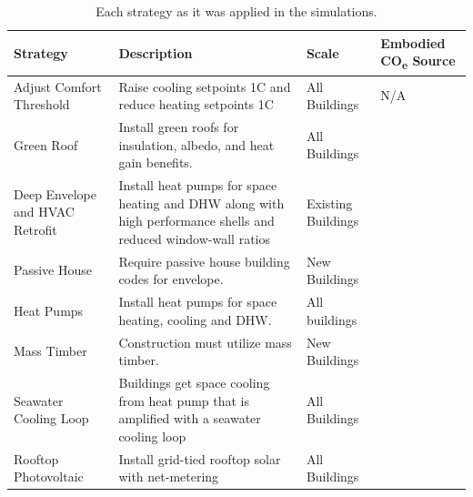 \documentclass[twocolumn, a4paper,10pt]{article}
\begin{document}
\begin{table}[ht]
    \vspace{-5pt}   %
    \caption{Each strategy as it was applied in the simulations.}
    \footnotesize
    \label{tab:strategies}
    \centering
    \begin{tabularx}{\linewidth}{|>{\hsize=0.2\hsize}X|
                              >{\hsize=0.4\hsize}X|
                              >{\hsize=0.15\hsize}X|
                              >{\hsize=0.25\hsize}X|}
        \hline
        \bf{Strategy} & \bf{Description} & \bf{Scale} & \bf{Embodied CO\textsubscript{e} Source} \\
        \hline
        Adjust Comfort Threshold & Raise cooling setpoints 1C and reduce heating setpoints 1C & All Buildings & N/A \\
        \hline
        Green Roof & Install green roofs for insulation, albedo, and heat gain benefits. & All Buildings & \citep{jones_ice_2019}\\
        \hline
        Deep Envelope and HVAC Retrofit & Install heat pumps for space heating and DHW along with high performance shells and reduced window-wall ratios & Existing Buildings & \citep{jones_ice_2019, rodriguez_embodied_2019} \\
        \hline
        Passive House & Require passive house building codes for envelope. & New Buildings & \citep{jones_ice_2019} \\
        \hline
        Heat Pumps & Install heat pumps for space heating, cooling and DHW. & All buildings & \citep{rodriguez_embodied_2019} \\
        \hline
        Mass Timber & Construction must utilize mass timber. & New Buildings & \citep{c-change_labs_embodied_2020} \\
        \hline
        Seawater Cooling Loop & Buildings get space cooling from heat pump that is amplified with a seawater cooling loop & All Buildings & \citep{noauthor_cpcn_2014, jones_ice_2019} \\
        \hline
        Rooftop Photovoltaic & Install grid-tied rooftop solar with net-metering & All Buildings  & \citep{jones_ice_2019} \\
        \hline
    \end{tabularx}
    \vspace{-5pt}   %
\end{table}
\end{document}
